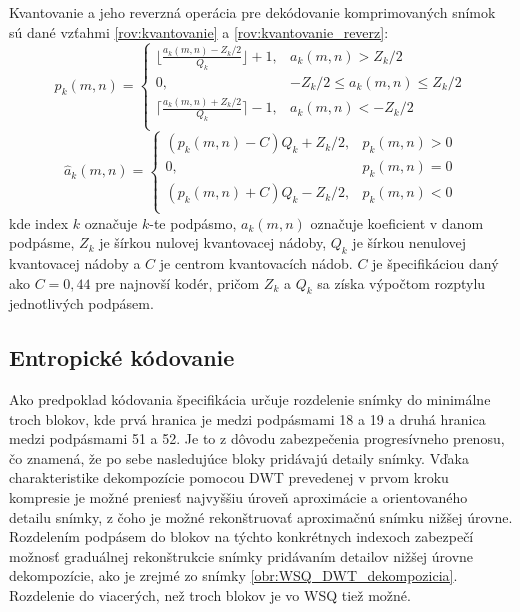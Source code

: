   Kvantovanie a jeho reverzná operácia pre dekódovanie komprimovaných snímok sú dané vzťahmi \ref{rov:kvantovanie} a \ref{rov:kvantovanie_reverz}:
  \begin{equation}
    p_k(m,n) =
    \begin{cases}
      \lfloor \frac{a_k(m,n) - Z_k / 2 }{Q_k} \rfloor + 1, & a_k(m,n) > Z_k/2 \\
      0, & -Z_k/2 \leq a_k(m,n) \leq Z_k/2 \\
      \lceil \frac{a_k(m,n) + Z_k / 2 }{Q_k} \rceil - 1, & a_k(m,n) < -Z_k/2 \\
    \end{cases}
    \label{rov:kvantovanie}
  \end{equation}
  \begin{equation}
    \hat{a}_k(m,n) = 
    \begin{cases}
      (p_k(m,n) - C)Q_k + Z_k/2, & p_k(m,n) > 0 \\
      0, & p_k(m,n) = 0 \\
      (p_k(m,n) + C)Q_k - Z_k/2, & p_k(m,n) < 0\\
    \end{cases}
    \label{rov:kvantovanie_reverz}
  \end{equation}
  kde index $k$ označuje $k$-te podpásmo, $a_k(m,n)$ označuje koeficient v danom podpásme, $Z_k$ je šírkou nulovej kvantovacej nádoby,
  $Q_k$ je šírkou nenulovej kvantovacej nádoby a $C$ je centrom kvantovacích nádob. $C$ je špecifikáciou daný ako $C = 0,44$ pre najnovší kodér,
  pričom $Z_k$ a $Q_k$ sa získa výpočtom rozptylu jednotlivých podpásem.


  \subsection{Entropické kódovanie}
  Ako predpoklad kódovania špecifikácia určuje rozdelenie snímky do minimálne troch blokov, kde prvá hranica je medzi podpásmami 18 a 19 a druhá
  hranica medzi podpásmami 51 a 52. Je to z dôvodu zabezpečenia progresívneho prenosu, čo znamená, že po sebe nasledujúce bloky pridávajú detaily
  snímky. Vďaka charakteristike dekompozície pomocou DWT prevedenej v prvom kroku kompresie je možné preniesť najvyššiu úroveň aproximácie a
  orientovaného detailu snímky, z čoho je možné rekonštruovať aproximačnú snímku nižšej úrovne. Rozdelením podpásem do blokov na týchto konkrétnych
  indexoch zabezpečí možnosť graduálnej rekonštrukcie snímky pridávaním detailov nižšej úrovne dekompozície,
  ako je zrejmé zo snímky \ref{obr:WSQ_DWT_dekompozicia}. Rozdelenie do viacerých, než troch blokov je vo WSQ tiež možné.

